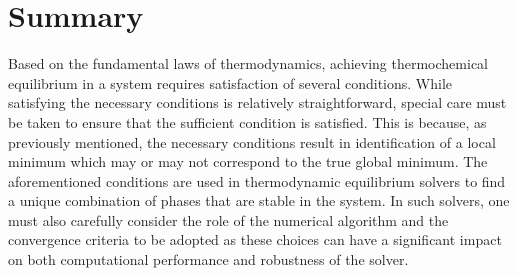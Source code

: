 \section{Summary}
Based on the fundamental laws of thermodynamics, achieving thermochemical equilibrium in a system requires satisfaction of several conditions. While satisfying the necessary conditions is relatively straightforward, special care must be taken to ensure that the sufficient condition is satisfied. This is because, as previously mentioned, the necessary conditions result in identification of a local minimum which may or may not correspond to the true global minimum. The aforementioned conditions are used in thermodynamic equilibrium solvers to find a unique combination of phases that are stable in the system. In such solvers, one must also carefully consider the role of the numerical algorithm and the convergence criteria to be adopted as these choices can have a significant impact on both computational performance and robustness of the solver.
